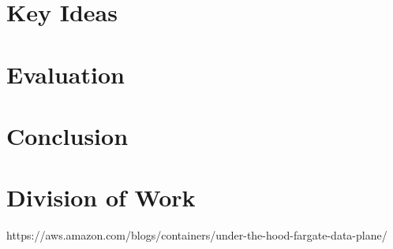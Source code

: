 \documentclass[11pt]{article}
\begin{document}
\section{Key Ideas}


\section{Evaluation}


\section{Conclusion}


\section{Division of Work}



https://aws.amazon.com/blogs/containers/under-the-hood-fargate-data-plane/
\end{document}

